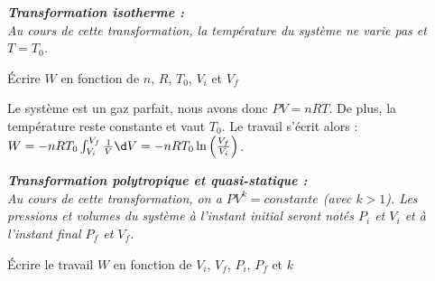 
\pauseEntrainement

{\itshape
		\textbf{Transformation isotherme :}\\
	Au cours de cette transformation, la température du système ne varie pas et $T=T_0$. 
\itshape
}
\repriseEntrainement

\begin{enonce}
	Écrire $W$ en fonction de $n$, $R$, $T_0$, $V_i$ et $V_f$
\end{enonce}


\begin{corrige}
	Le système est un gaz parfait, nous avons donc $PV=nRT$. De plus, la température reste constante et vaut $T_0$.
	Le travail s'écrit alors : $W= -nRT_0 \int_{V_{i}}^{V_{f}} \frac{1}{V} \d V=-nRT_0 \ln \left(\frac{V_{f}}{V_{i}} \right)$.
\end{corrige}

\pauseEntrainement

{\itshape
	\textbf{Transformation polytropique et quasi-statique :}\\
	Au cours de cette transformation, on a $PV^k=constante$ (avec $k>1$). Les pressions et volumes du système à l'instant initial seront notés $P_i$ et $V_i$ et à l'instant final $P_f$ et $V_f$. 
	\itshape
}
\repriseEntrainement

\begin{enonce}
	Écrire le travail $W$ en fonction de $V_i$, $V_f$, $P_i$, $P_f$ et $k$ 
\end{enonce}

